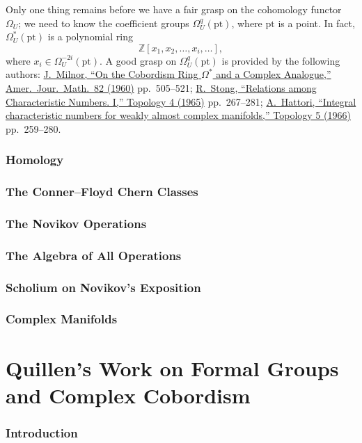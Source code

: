 \documentclass[english, oneside, letterpaper]{book}
\newcommand{\Z}{\mathbb{Z}}
\newcommand{\pt}{\mathrm{pt}}
\newcommand{\nn}[2]{#2} %
\begin{document}
\label{page-adams-7}
Only one thing remains before we have a fair grasp on the cohomology functor $\Omega_U$; we need to know the coefficient groups $\Omega_U^q(\nn{P}{\pt})$, where $\nn{P}{\pt}$ is a point. In fact, $\Omega^*_U(\nn{P}{\pt})$ is a polynomial ring
\[\Z[x_1,x_2,\ldots,x_i,\ldots],\]
where $x_i\in\Omega_U^{-2i}(\nn{P}{\pt})$. A good grasp on $\Omega_U^q(\nn{P}{\pt})$ is provided by the following authors: \href{https://www.jstor.org/stable/2372970?seq=1#metadata_info_tab_contents}{J.\ Milnor, ``On the Cobordism Ring $\Omega^*$ and a Complex Analogue,'' Amer.\ Jour.\ Math.\ 82 (1960)} pp.\ 505--521; \href{https://www.sciencedirect.com/science/article/pii/004093836590011X}{R.\ Stong, ``Relations among Characteristic Numbers. I,'' Topology 4 (1965)} pp.\ 267--281; \href{https://www.sciencedirect.com/science/article/pii/0040938366900103}{A.\ Hattori, ``Integral characteristic numbers for weakly almost complex manifolds,'' Topology 5 (1966)} pp.\ 259--280.
\section{Homology}\label{sec:part-1-sec-3}
\section{The Conner--Floyd Chern Classes}\label{sec:part-1-sec-4}
\section{The Novikov Operations}\label{sec:part-1-sec-5}
\section{The Algebra of All Operations}\label{sec:part-1-sec-6}
\section{Scholium on Novikov's Exposition}\label{sec:part-1-sec-7}
\section{Complex Manifolds}\label{sec:part-1-sec-8}
\part{Quillen's Work on Formal Groups and Complex Cobordism}\label{part:2}
\setcounter{section}{0}
\section{Introduction}\label{sec:part-2-sec0}
\end{document}
